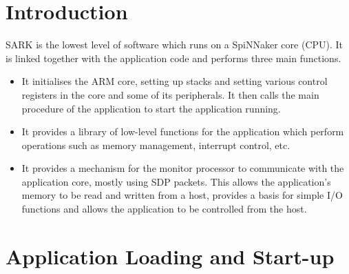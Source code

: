 %
%
%

\def\FullTitle{SARK - SpiNNaker Application Runtime Kernel}
\def\ShortTitle{SARK 2.0.0}
\def\Date{8 Mar 2016}
\def\Version{2.0.0}
\def\Author{Steve Temple}
\def\Email{steven.temple@manchester.ac.uk}




\section{Introduction}

SARK is the lowest level of software which runs on a SpiNNaker core
(CPU). It is linked together with the application code and performs
three main functions.

\begin{itemize}
\item
It initialises the ARM core, setting up stacks and setting various
control registers in the core and some of its peripherals. It then
calls the main procedure of the application to start the application
running.

\item
It provides a library of low-level functions for the application
which perform operations such as memory management, interrupt control,
etc.

\item
It provides a mechanism for the monitor processor to communicate with
the application core, mostly using SDP packets. This allows the
application's memory to be read and written from a host, provides a
basis for simple I/O functions and allows the application to be
controlled from the host.
\end{itemize}

\section{Application Loading and Start-up}

